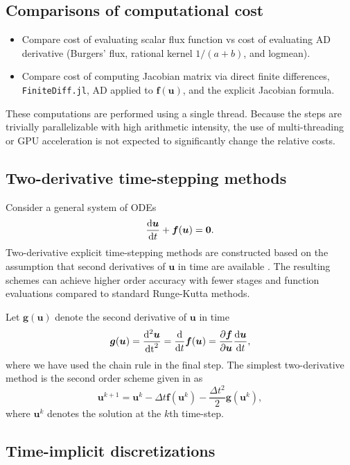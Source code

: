\documentclass{article}
\newcommand{\td}[2]{\frac{{\rm d}#1}{{\rm d}{ {#2}}}}
\newcommand{\pd}[2]{\frac{\partial#1}{\partial#2}}
\begin{document}
\subsection{Comparisons of computational cost}

\begin{itemize}
\item Compare cost of evaluating scalar flux function vs cost of evaluating AD derivative (Burgers' flux, rational kernel $1/(a+b)$, and logmean).
\item Compare cost of computing Jacobian matrix via direct finite differences, \verb+FiniteDiff.jl+, AD applied to $\bm{f}(\bm{u})$, and the explicit Jacobian formula.  
\end{itemize}
These computations are performed using a single thread.  Because the steps are trivially parallelizable with high arithmetic intensity, the use of multi-threading or GPU acceleration is not expected to significantly change the relative costs.  

\subsection{Two-derivative time-stepping methods}

Consider a general system of ODEs
\[
\td{\bm{u}}{t} + \bm{f}(\bm{u}) = \bm{0}.
\]
Two-derivative explicit time-stepping methods are constructed based on the assumption that second derivatives of $\bm{u}$ in time are available \cite{chan2010explicit, christlieb2016explicit}.  The resulting schemes can achieve higher order accuracy with fewer stages and function evaluations compared to standard Runge-Kutta methods.  

Let $\bm{g}(\bm{u})$ denote the second derivative of $\bm{u}$ in time
\[
\bm{g}(\bm{u}) = \frac{{\rm d}^2 \bm{u}}{{\rm dt}^2} = \td{}{t} \bm{f}(\bm{u}) = \pd{\bm{f}}{\bm{u}}\td{\bm{u}}{t},
\]
where we have used the chain rule in the final step.  The simplest two-derivative method is the second order scheme given in \cite{chan2010explicit} as
\[
\bm{u}^{k+1} = \bm{u}^k - \Delta t \bm{f}(\bm{u}^k) - \frac{\Delta t^2}{2} \bm{g}(\bm{u}^k),
\]
where $\bm{u}^k$ denotes the solution at the $k$th time-step.  



\subsection{Time-implicit discretizations}
\end{document}
